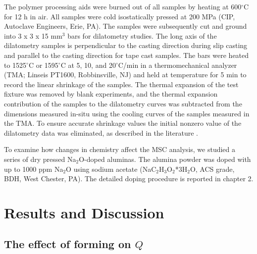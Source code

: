 The polymer processing aids were burned out of all samples by heating at 600$^{\circ}$C for 12 h in air. All samples were cold isostatically pressed at 200 MPa (CIP, Autoclave Engineers, Erie, PA). The samples were subsequently cut and ground into 3 x 3 x 15 mm$^{3}$ bars for dilatometry studies. The long axis of the dilatometry samples is perpendicular to the casting direction during slip casting and parallel to the casting direction for tape cast samples. The bars were heated to 1525$^{\circ}$C or 1595$^{\circ}$C at 5, 10, and 20$^{\circ}$C/min in a thermomechanical analyzer (TMA; Linseis PT1600, Robbinsville, NJ) and held at temperature for 5 min to record the linear shrinkage of the samples. The thermal expansion of the test fixture was removed by blank experiments, and the thermal expansion contribution of the samples to the dilatometry curves was subtracted from the dimensions measured in-situ using the cooling curves of the samples measured in the TMA. To ensure accurate shrinkage values the initial nonzero value of the dilatometry data was eliminated, as described in the literature \cite{Blaine2006}.

To examine how changes in chemistry affect the MSC analysis, we studied a series of dry pressed Na$_{2}$O-doped aluminas. The alumina powder was doped with up to 1000 ppm Na$_{2}$O using sodium acetate (NaC$_{2}$H$_{3}$O$_{2}$*3H$_{2}$O, ACS grade, BDH, West Chester, PA). The detailed doping procedure is reported in chapter 2.


\section{Results and Discussion}

\subsection{The effect of forming on $Q$}

